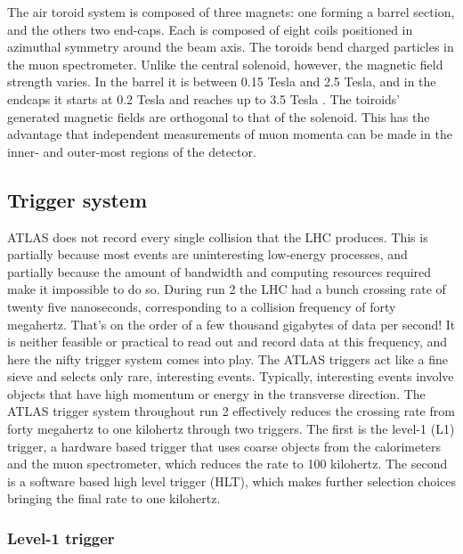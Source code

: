 The air toroid system is composed of three magnets: one forming a barrel section, and the others two end-caps. Each is composed of eight coils positioned in azimuthal symmetry around the beam axis. The toroids bend charged particles in the muon spectrometer. Unlike the central solenoid, however, the magnetic field strength varies. In the barrel it is between 0.15 Tesla and 2.5 Tesla, and in the endcaps it starts at 0.2 Tesla and reaches up to 3.5 Tesla . The toiroids' generated magnetic fields are orthogonal to that of the solenoid. This has the advantage that independent measurements of muon momenta can be made in the inner- and outer-most regions of the detector.

\subsection{Trigger system}
\label{ssec:ATLAStrigger}
ATLAS does not record every single collision that the LHC produces. This is partially because most events are uninteresting low-energy processes, and partially because the amount of bandwidth and computing resources required make it impossible to do so. During run 2 the LHC had a bunch crossing rate of twenty five nanoseconds, corresponding to a collision frequency of forty megahertz. That's on the order of a few thousand gigabytes of data per second! It is neither feasible or practical to read out and record data at this frequency, and here the nifty trigger system comes into play. The ATLAS triggers act like a fine sieve and selects only rare, interesting events. Typically, interesting events involve objects that have high momentum or energy in the transverse direction. The ATLAS trigger system throughout run 2 effectively reduces the crossing rate from forty megahertz to one kilohertz through two triggers. The first is the level-1 (L1) trigger, a hardware based trigger that uses coarse objects from the calorimeters and the muon spectrometer, which reduces the rate to 100 kilohertz. The second is a software based high level trigger (HLT), which makes further selection choices bringing the final rate to one kilohertz. 

\subsubsection{Level-1 trigger}


